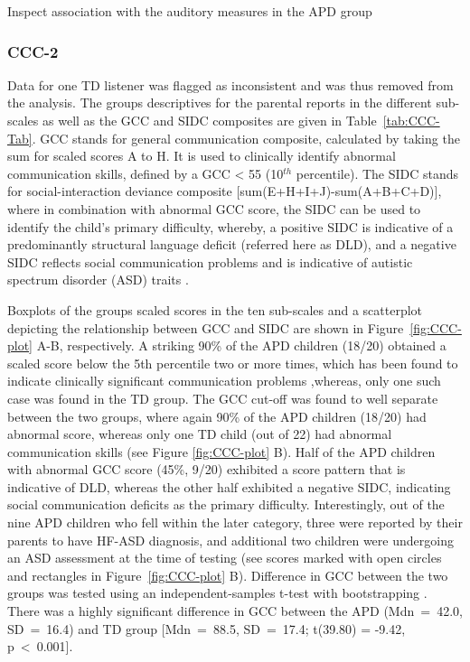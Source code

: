 \documentclass[a4paper, twoside]{templates/ociamthesis}
\begin{document}
Inspect association with the auditory measures in the APD group

\hypertarget{ccc-2}{%
\subsubsection{CCC-2}\label{ccc-2}}

Data for one TD listener was flagged as inconsistent and was thus removed from the analysis. The groups descriptives for the parental reports in the different sub-scales as well as the GCC and SIDC composites are given in Table~\ref{tab:CCC-Tab}. GCC stands for general communication composite, calculated by taking the sum for scaled scores A to H. It is used to clinically identify abnormal communication skills, defined by a GCC \textless{} 55 (10\(^{th}\) percentile). The SIDC stands for social-interaction deviance composite {[}sum(E+H+I+J)-sum(A+B+C+D){]}, where in combination with abnormal GCC score, the SIDC can be used to identify the child's primary difficulty, whereby, a positive SIDC is indicative of a predominantly structural language deficit (referred here as DLD), and a negative SIDC reflects social communication problems and is indicative of autistic spectrum disorder (ASD) traits \autocite{Norbury2014,Bishop2003}.

Boxplots of the groups scaled scores in the ten sub-scales and a scatterplot depicting the relationship between GCC and SIDC are shown in Figure~\ref{fig:CCC-plot} A-B, respectively. A striking 90\% of the APD children (18/20) obtained a scaled score below the 5th percentile two or more times, which has been found to indicate clinically significant communication problems \autocite[ 2003]{Bishop},whereas, only one such case was found in the TD group. The GCC cut-off was found to well separate between the two groups, where again 90\% of the APD children (18/20) had abnormal score, whereas only one TD child (out of 22) had abnormal communication skills (see Figure \ref{fig:CCC-plot} B). Half of the APD children with abnormal GCC score (45\%, 9/20) exhibited a score pattern that is indicative of DLD, whereas the other half exhibited a negative SIDC, indicating social communication deficits as the primary difficulty. Interestingly, out of the nine APD children who fell within the later category, three were reported by their parents to have HF-ASD diagnosis, and additional two children were undergoing an ASD assessment at the time of testing (see scores marked with open circles and rectangles in Figure~\ref{fig:CCC-plot} B). Difference in GCC between the two groups was tested using an independent-samples t-test with bootstrapping \autocite[\emph{MKinfer::boot.t.test()}, n=9999;][]{MKinferPackageR}. There was a highly significant difference in GCC between the APD (Mdn~=~42.0, SD~=~16.4) and TD group {[}Mdn~=~88.5, SD~=~17.4; t(39.80) = -9.42, p~\textless~0.001{]}.
\end{document}
